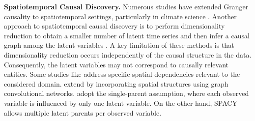  \textbf{Spatiotemporal Causal Discovery.} Numerous studies have extended Granger causality to spatiotemporal settings, particularly in climate science \citep{GrangerCausalityofCoupledClimateProcessesOceanFeedbackontheNorthAtlanticOscillation, lozano2009grangerspatial, Grangercausalitycarbondioxide}. Another approach to spatiotemporal causal discovery is to perform dimensionality reduction to obtain a smaller number of latent time series and then infer a causal graph among the latent variables \citep{xavi2022teleconnection, Falasca_2024}. A key limitation of these methods is that dimensionality reduction occurs independently of the causal structure in the data. Consequently, the latent variables may not correspond to causally relevant entities. Some studies like \citet{sheth2022stcd} address specific spatial dependencies relevant to the considered domain. \citet{zhao2023generativecausal} extend \citet{yao2022temporally} by incorporating spatial structures using graph convolutional networks. \citet{brouillard2024causal, boussard2023towards} adopt the single-parent assumption, where each observed variable is influenced by only one latent variable. On the other hand, SPACY allows multiple latent parents per observed variable.

% 







